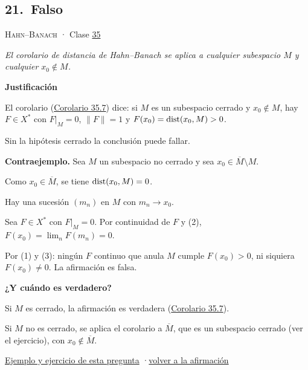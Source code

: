 \documentclass[11pt,a4paper]{article}
\newcommand{\cl}[1]{\overline{#1}}\newcommand{\norm}[1]{\lVert #1\rVert}\newcommand{\abs}[1]{\lvert #1\rvert}
\newcommand{\bloque}[1]{\par\smallskip\noindent\textbf{\color{acento}#1}\par}
\begin{document}
\subsection*{\hypertarget{r-21}{}21.\ \textcolor{bad}{Falso}}
{\small \textsc{Hahn–Banach} · Clase \href{https://decostruttivismo.github.io/MAT2514-repaso/pdf/MAT2514_apuntes_completos.pdf\#nameddest=section.35}{35}}\par
\emph{El corolario de distancia de Hahn–Banach se aplica a cualquier subespacio $M$ y cualquier $x_0\notin M$.}
\bloque{Justificación}
\begin{pasos}
\item[] El corolario (\href{https://decostruttivismo.github.io/MAT2514-repaso/pdf/MAT2514_apuntes_completos.pdf\#nameddest=teorema.35.7}{Corolario 35.7}) dice: si $M$ es un subespacio cerrado y $x_0\notin M$, hay $F\in X^*$ con $F|_M=0$, $\norm F=1$ y $F(x_0)=\operatorname{dist}(x_0,M)> 0$.
\item[] Sin la hipótesis \guillemotleft{}cerrado\guillemotright{} la conclusión puede fallar.
\item[] \textbf{Contraejemplo.} Sea $M$ un subespacio no cerrado y sea $x_0\in\cl M\setminus M$.
\item[(1)] Como $x_0\in\cl M$, se tiene $\operatorname{dist}(x_0,M)=0$.
\item[(2)] Hay una sucesión $(m_n)$ en $M$ con $m_n\to x_0$.
\item[(3)] Sea $F\in X^*$ con $F|_M=0$. Por continuidad de $F$ y (2), $F(x_0)=\lim_nF(m_n)=0$.
\item[] Por (1) y (3): ningún $F$ continuo que anula $M$ cumple $F(x_0)\gt 0$, ni siquiera $F(x_0)\ne0$. La afirmación es falsa.
\end{pasos}
\bloque{¿Y cuándo es verdadero?}
\begin{pasos}
\item[] Si $M$ es cerrado, la afirmación es verdadera (\href{https://decostruttivismo.github.io/MAT2514-repaso/pdf/MAT2514_apuntes_completos.pdf\#nameddest=teorema.35.7}{Corolario 35.7}).
\item[] Si $M$ no es cerrado, se aplica el corolario a $\cl M$, que es un subespacio cerrado (ver el ejercicio), con $x_0\notin\cl M$.
\end{pasos}
\par{}
\par{\small \hyperlink{e-21}{Ejemplo y ejercicio de esta pregunta} \quad·\quad \hyperlink{q-21}{volver a la afirmación}}
\end{document}
